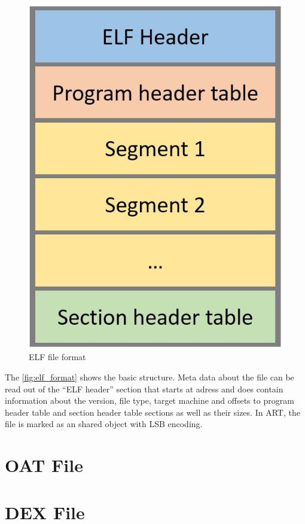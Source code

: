 \begin{figure}[htb]
  \centering
  \includegraphics[scale=0.3]{figures/elf_format}
  \caption[ELF file format]{ELF file format}
  \label{fig:elf_format}
\end{figure}

The \autoref{fig:elf_format} shows the basic structure.
Meta data about the file can be read out of the ``ELF header''
section that starts at adress  and does contain
information about the version, file type, target machine and
offsets to program header table and section header table
sections as well as their sizes.
In ART, the file is marked as an shared object with LSB encoding.


\section{OAT File}

\section{DEX File}
